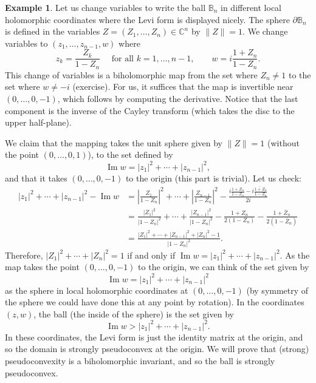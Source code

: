 \documentclass[12pt,openany]{book}
\renewcommand{\Im}{\operatorname{Im}}
\newcommand{\sabs}[1]{\lvert {#1} \rvert}
\newcommand{\snorm}[1]{\lVert {#1} \rVert}
\newcommand{\abs}[1]{\left\lvert {#1} \right\rvert}
\newcommand{\C}{{\mathbb{C}}}
\newcommand{\bB}{{\mathbb{B}}}
\theoremstyle{plain}
\theoremstyle{remark}
\theoremstyle{definition}
\theoremstyle{exercise}
\theoremstyle{example}
\newtheorem{example}[thm]{Example}
\begin{document}
\begin{example}
Let us change variables to write the ball $\bB_n$ in different
local holomorphic coordinates where the Levi form is displayed nicely.
The sphere $\partial \bB_n$ is defined in the variables $Z = (Z_1,\ldots,Z_n) \in \C^n$
by $\snorm{Z} = 1$.
We change variables to $(z_1,\ldots,z_{n-1},w)$ where
\begin{equation*}
z_k = \frac{Z_k}{1-Z_n} \quad \text{ for all $k=1,\ldots,n-1$}, \qquad
w = i\frac{1+Z_n}{1-Z_n} .
\end{equation*}
This change of variables is a biholomorphic map from the set where $Z_n \not= 1$
to the set where $w\not= -i$ (exercise).  For us, it suffices
that the map is invertible near
$(0,\ldots,0,-1)$, which follows by computing the derivative.
Notice
that the last component is the inverse of the Cayley transform (which takes
the disc to the upper half-plane).

We claim that the mapping takes the unit sphere given by $\snorm{Z} = 1$
(without the point $(0,\ldots,0,1)$), to
the set defined by
\begin{equation*}
\Im w = \sabs{z_1}^2 + \cdots + \sabs{z_{n-1}}^2 ,
\end{equation*}
and that it takes $(0,\ldots,0,-1)$ to the origin (this part is trivial).
Let us check:
\begin{equation*}
\begin{split}
\sabs{z_1}^2 + \cdots + \sabs{z_{n-1}}^2 - \Im w
& =
\abs{\frac{Z_1}{1-Z_n}}^2
+ \cdots +
\abs{\frac{Z_{n-1}}{1-Z_n}}^2
-
\frac{
i\frac{1+Z_n}{1-Z_n} -
\overline{
i\frac{1+Z_n}{1-Z_n}}
}{2i}
\\
& =
\frac{\sabs{Z_1}^2}{\sabs{1-Z_n}^2}
+ \cdots +
\frac{\sabs{Z_{n-1}}^2}{\sabs{1-Z_n}^2}
-
\frac{1+Z_n}{2(1-Z_n)} -
\frac{1+\bar{Z}_n}{2(1-\bar{Z}_n)}
\\
& =
\frac{\sabs{Z_1}^2
+ \cdots +
\sabs{Z_{n-1}}^2
+
\sabs{Z_n}^2-1}{\sabs{1-Z_n}^2} .
\end{split}
\end{equation*}
Therefore, $\sabs{Z_1}^2 + \cdots + \sabs{Z_n}^2 = 1$ if and only if $\Im w =
\sabs{z_1}^2 + \cdots + \sabs{z_{n-1}}^2$.
As the map takes the point $(0,\ldots,0,-1)$ to the origin, we can
think of the set given by
\begin{equation*}
\Im w = \sabs{z_1}^2 + \cdots + \sabs{z_{n-1}}^2
\end{equation*}
as the sphere in local holomorphic coordinates at $(0,\ldots,0,-1)$ (by symmetry
of the sphere we could have done this at any point by rotation).
In the coordinates $(z,w)$, the ball (the inside of the sphere) is the set given by
\begin{equation*}
\Im w > \sabs{z_1}^2 + \cdots + \sabs{z_{n-1}}^2 .
\end{equation*}
In these coordinates, the Levi form is just the identity matrix at the
origin, and so the domain is strongly pseudoconvex at the origin.
We will prove that (strong) pseudoconvexity is a biholomorphic invariant,
and so the ball is strongly pseudoconvex.


\end{example}
\end{document}
